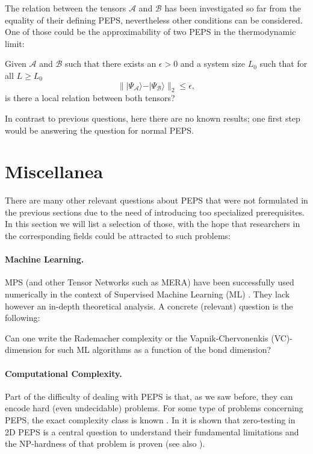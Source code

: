\documentclass[smallextended]{svjour3}
\renewcommand{\1}{\mathbbm{1}}
\newcommand{\ket} [1] {\vert #1 \rangle}
\begin{document}
The relation between the tensors $\mathcal{A}$ and $\mathcal{B}$ has been investigated so far from the equality of their defining PEPS, nevertheless other conditions can be considered.  One of those could be the approximability of two PEPS in the thermodynamic limit:
\begin{question}
    Given $\mathcal{A}$ and $\mathcal{B}$ such that there exists an $\epsilon >0$ and a system size $L_0$ such that for all $L \ge L_0$
    $$\| \ket{\Psi_{\mathcal{A}}} -\ket{\Psi_{\mathcal{B}}}\|_2\le \epsilon,$$
    is there a local relation between both tensors?
\end{question}
In contrast to previous questions, here there are no known results; one first step would be answering the question for normal PEPS.

\section{Miscellanea}

There are many other relevant questions about PEPS that were not formulated in the previous sections due to the need of introducing too specialized prerequisites. In this section we will list a selection of those, with the hope that researchers in the corresponding fields could be attracted to such problems:

\paragraph{Machine Learning.} MPS (and other Tensor Networks such as MERA) have been successfully used numerically in the context of Supervised Machine Learning (ML)  \cite{Stoudenmire}. They lack however an in-depth theoretical analysis. A concrete (relevant) question is the following:

\begin{question}
    Can one write the Rademacher complexity or the Vapnik-Chervonenkis (VC)-dimension for such ML algorithms as a function of the bond dimension?
\end{question}

\paragraph{Computational Complexity.} Part of the difficulty of dealing with PEPS is that, as we saw before, they can encode hard (even undecidable) problems. For some type of problems concerning PEPS, the exact complexity class is known \cite{Schuch07}.
In \cite{uncomputable-PEPS} it is shown that zero-testing in 2D PEPS is a central question to understand their fundamental limitations and the NP-hardness of that problem is proven (see also \cite{Gharibian}).
\end{document}
